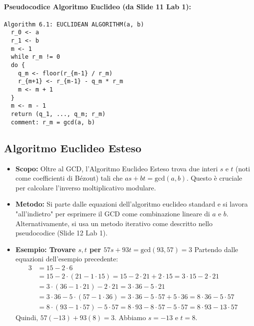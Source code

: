 \paragraph{Pseudocodice Algoritmo Euclideo (da Slide 11 Lab 1):}
\begin{verbatim}
Algorithm 6.1: EUCLIDEAN ALGORITHM(a, b)
  r_0 <- a
  r_1 <- b
  m <- 1
  while r_m != 0
  do {
    q_m <- floor(r_{m-1} / r_m)
    r_{m+1} <- r_{m-1} - q_m * r_m
    m <- m + 1
  }
  m <- m - 1
  return (q_1, ..., q_m; r_m)
  comment: r_m = gcd(a, b)
\end{verbatim}

\subsection{Algoritmo Euclideo Esteso}
\begin{itemize}
    \item \textbf{Scopo:} Oltre al GCD, l'Algoritmo Euclideo Esteso trova due interi \(s\) e \(t\) (noti come coefficienti di Bézout) tali che \(as + bt = \text{gcd}(a, b)\). Questo è cruciale per calcolare l'inverso moltiplicativo modulare.
    \item \textbf{Metodo:} Si parte dalle equazioni dell'algoritmo euclideo standard e si lavora "all'indietro" per esprimere il GCD come combinazione lineare di \(a\) e \(b\). Alternativamente, si usa un metodo iterativo come descritto nello pseudocodice (Slide 12 Lab 1).
    \item \textbf{Esempio: Trovare \(s, t\) per \(57s + 93t = \text{gcd}(93, 57) = 3\)}
    Partendo dalle equazioni dell'esempio precedente:
    \begin{align*}
        3 &= 15 - 2 \cdot 6 \\
          &= 15 - 2 \cdot (21 - 1 \cdot 15) = 15 - 2 \cdot 21 + 2 \cdot 15 = 3 \cdot 15 - 2 \cdot 21 \\
          &= 3 \cdot (36 - 1 \cdot 21) - 2 \cdot 21 = 3 \cdot 36 - 5 \cdot 21 \\
          &= 3 \cdot 36 - 5 \cdot (57 - 1 \cdot 36) = 3 \cdot 36 - 5 \cdot 57 + 5 \cdot 36 = 8 \cdot 36 - 5 \cdot 57 \\
          &= 8 \cdot (93 - 1 \cdot 57) - 5 \cdot 57 = 8 \cdot 93 - 8 \cdot 57 - 5 \cdot 57 = 8 \cdot 93 - 13 \cdot 57
    \end{align*}
    Quindi, \(57(-13) + 93(8) = 3\). Abbiamo \(s = -13\) e \(t = 8\).
\end{itemize}

